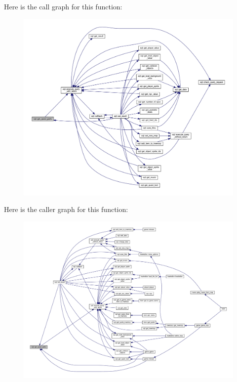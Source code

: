 Here is the call graph for this function\+:
\nopagebreak
\begin{figure}[H]
\begin{center}
\leavevmode
\includegraphics[width=350pt]{classsql_a9f75a32a77a498b1a328a53ade518ce7_cgraph}
\end{center}
\end{figure}
Here is the caller graph for this function\+:
\nopagebreak
\begin{figure}[H]
\begin{center}
\leavevmode
\includegraphics[width=350pt]{classsql_a9f75a32a77a498b1a328a53ade518ce7_icgraph}
\end{center}
\end{figure}
\mbox{\label{classsql_a59249e218b1bb9d811c50b5615312eaf}} 
